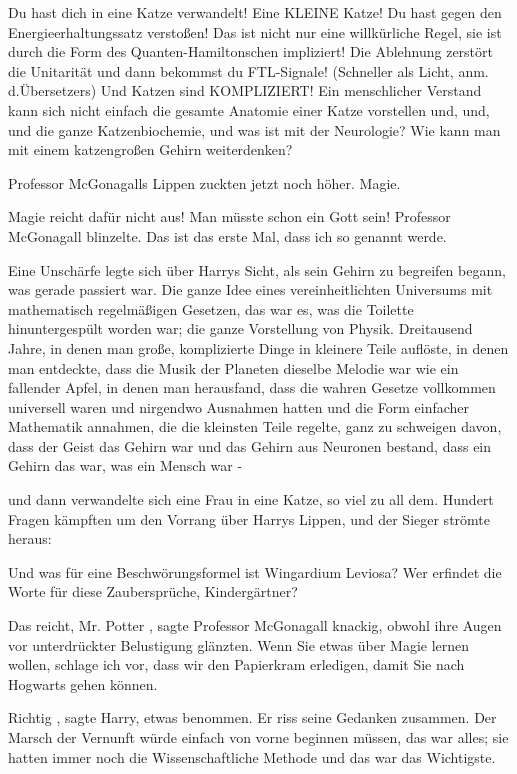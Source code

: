 \glqq Du hast dich in eine Katze verwandelt! Eine KLEINE Katze! Du hast gegen
den Energieerhaltungssatz verstoßen! Das ist nicht nur eine willkürliche Regel,
sie ist durch die Form des Quanten-Hamiltonschen impliziert! Die Ablehnung
zerstört die Unitarität und dann bekommst du FTL-Signale! (Schneller als Licht,
anm. d.Übersetzers) Und Katzen sind KOMPLIZIERT! Ein menschlicher Verstand kann
sich nicht einfach die gesamte Anatomie einer Katze vorstellen und, und, und die
ganze Katzenbiochemie, und was ist mit der Neurologie? Wie kann man mit einem
katzengroßen Gehirn weiterdenken?\grqq{}

Professor McGonagalls Lippen zuckten jetzt noch höher. \glqq Magie.\grqq{}

\glqq Magie reicht dafür nicht aus! Man müsste schon ein Gott sein!\grqq{}
Professor McGonagall blinzelte. \glqq Das ist das erste Mal, dass ich so genannt
werde.\grqq{}

Eine Unschärfe legte sich über Harrys Sicht, als sein Gehirn zu begreifen
begann, was gerade passiert war. Die ganze Idee eines vereinheitlichten
Universums mit mathematisch regelmäßigen Gesetzen, das war es, was die Toilette
hinuntergespült worden war; die ganze Vorstellung von Physik. Dreitausend Jahre,
in denen man große, komplizierte Dinge in kleinere Teile auflöste, in denen man
entdeckte, dass die Musik der Planeten dieselbe Melodie war wie ein fallender
Apfel, in denen man herausfand, dass die wahren Gesetze vollkommen universell
waren und nirgendwo Ausnahmen hatten und die Form einfacher Mathematik annahmen,
die die kleinsten Teile regelte, ganz zu schweigen davon, dass der Geist das
Gehirn war und das Gehirn aus Neuronen bestand, dass ein Gehirn das war, was ein
Mensch war -

und dann verwandelte sich eine Frau in eine Katze, so viel zu all dem. Hundert
Fragen kämpften um den Vorrang über Harrys Lippen, und der Sieger strömte
heraus:

\glqq Und was für eine Beschwörungsformel ist Wingardium Leviosa? Wer erfindet
die Worte für diese Zaubersprüche, Kindergärtner?\grqq{}

\glqq Das reicht, Mr. Potter\grqq{} , sagte Professor McGonagall knackig, obwohl ihre
Augen vor unterdrückter Belustigung glänzten. \glqq Wenn Sie etwas über Magie
lernen wollen, schlage ich vor, dass wir den Papierkram erledigen, damit Sie
nach Hogwarts gehen können.\grqq{}

\glqq Richtig\grqq{} , sagte Harry, etwas benommen. Er riss seine Gedanken zusammen.
Der Marsch der Vernunft würde einfach von vorne beginnen müssen, das war alles;
sie hatten immer noch die Wissenschaftliche Methode und das war das Wichtigste.

